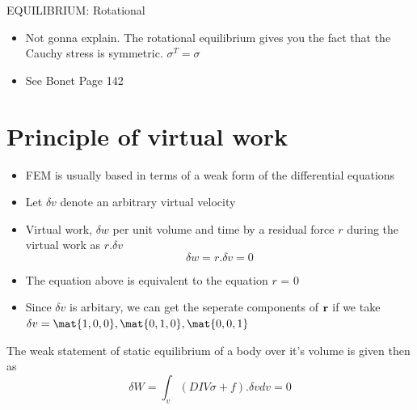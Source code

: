 	\begin{frame}{EQUILIBRIUM: Rotational}
		\begin{itemize}
			\item Not gonna explain. The rotational equilibrium gives you the fact that the Cauchy stress is symmetric. $\sigma^T = \sigma$
			\item See Bonet Page 142
			
		\end{itemize}
	\end{frame}


\section{Principle of virtual work}
	\begin{frame}
	\begin{itemize}
		\item FEM is usually based in terms of a weak form of the differential equations
		\item Let $\delta v$ denote an arbitrary virtual velocity
		\item Virtual work, $\delta w$ per unit volume and time by a residual force $r$ during the virtual work as $r.\delta v$
		\begin{equation}
			\delta w = r.\delta v = 0
		\end{equation}
		\item The equation above is equivalent to the equation $r$ = 0 
		\item  Since $\delta v$ is arbitary, we can get the seperate components of $\mathbf{r}$ if we take $\delta v = \mat{1,0,0}, \mat{0,1,0} , \mat{0,0,1}$
	\end{itemize}
	\begin{block}{}
		The weak statement of static equilibrium of a body over it's volume is given then as
		\begin{equation}
			\delta W = \int_v  \left(DIV \sigma +f \right).\delta v dv  = 0
		\end{equation}
	\end{block}
	\end{frame}


